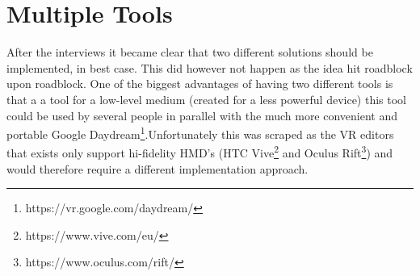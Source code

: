 \section{Multiple Tools}
After the interviews it became clear that two different solutions should be implemented, in best case. This did however not happen as the idea hit roadblock upon roadblock. One of the biggest advantages of having two different tools is that a a tool for a low-level medium (created for a less powerful device) this tool could be used by several people in parallel with the much more convenient and portable Google Daydream\footnote{https://vr.google.com/daydream/}.Unfortunately this was scraped as the VR editors that exists only support hi-fidelity HMD's (HTC Vive\footnote{https://www.vive.com/eu/} and Oculus Rift\footnote{https://www.oculus.com/rift/}) and would therefore require a different implementation approach.
